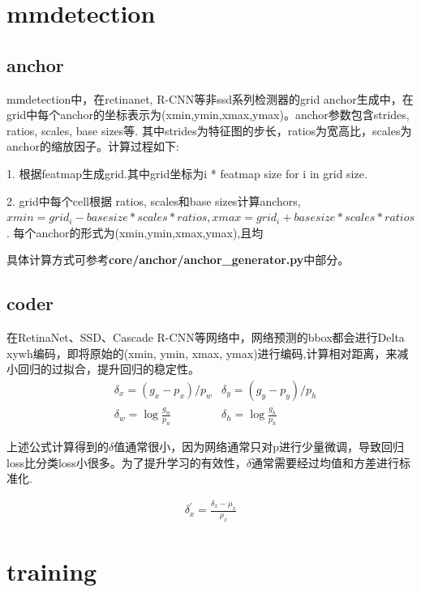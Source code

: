 \documentclass{article}
\begin{document}
\section{mmdetection}

\subsection{anchor}
mmdetection中，在retinanet, R-CNN等非ssd系列检测器的grid anchor生成中，在grid中每个anchor的坐标表示为(xmin,ymin,xmax,ymax)。anchor参数包含strides, ratios, scales, base sizes等. 其中strides为特征图的步长，ratios为宽高比，scales为anchor的缩放因子。计算过程如下:

1. 根据featmap生成grid.其中grid坐标为i * featmap size for i in grid size.

2. grid中每个cell根据 ratios,  scales和base sizes计算anchors,$xmin = grid_i -  basesize*scales*ratios, xmax = grid_i +basesize*scales*ratios$.
每个anchor的形式为(xmin,ymin,xmax,ymax),且均

 具体计算方式可参考\textbf{core/anchor/anchor\_generator.py}中部分。

\subsection{coder}
在RetinaNet、SSD、Cascade R-CNN等网络中，网络预测的bbox都会进行Delta xywh编码，即将原始的(xmin, ymin, xmax, ymax)进行编码,计算相对距离，来减小回归的过拟合，提升回归的稳定性。
\begin{equation}
\begin{aligned}
&\delta_x = (g_x-p_x)/p_w	   & \delta_y = (g_y - p_y)/p_h \\
&\delta_w = \log{\frac{g_w}{p_w}}	&\delta_h = \log{\frac{g_h}{p_h}}
\end{aligned}\label{bbox_coder}
\end{equation}

上述公式计算得到的$\delta$值通常很小，因为网络通常只对p进行少量微调，导致回归loss比分类loss小很多。为了提升学习的有效性，$\delta$通常需要经过均值和方差进行标准化.

\begin{equation}
\begin{aligned}
\delta_{x}^{'}=\frac{\delta_x-\mu_x}{\rho_x}
\end{aligned}
\end{equation}

\section{training}
\end{document}
